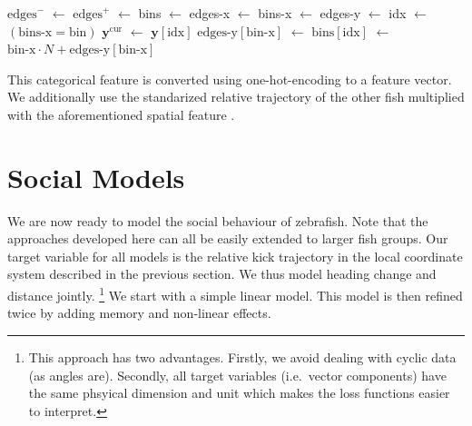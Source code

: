 \documentclass[nobib, a4paper]{tufte-handout}
\newcommand*\Let[2]{\State #1 \(\gets\) #2}
\begin{document}
\MakeRobust{\Call} %
\begin{algorithm}[htb]
  \caption{%
\label{alg:binning}
    Data-driven Spatial Binning}

  \begin{algorithmic}
    \Let{$\text{edges}^-$}{}
    \Let{$\text{edges}^+$}{}
    \State \Return {}
\EndFunction 
{}
\Let{bins}{}
\Let{edges-x}{}
  \Let{bins-x}{}
  \Let{edges-y}{}
  \Let{idx}{$(\text{bins-x} = \text{bin})$}
  \Let{$\bm{y}^{\text{cur}}$}{$\bm{y} [\text{idx}]$}
  \Let{$\text{edges-y}[\text{bin-x}]$}{}
  \Let{$\text{bins}[\text{idx}]$}{$\text{bin-x} \cdot N + \text{edges-y}[\text{bin-x}]$}
\EndFor
{}
\end{algorithmic}
\end{algorithm}

This categorical feature is converted using one-hot-encoding to a feature vector.
We additionally use the standarized relative trajectory of the other fish multiplied with the aforementioned spatial feature%
.

\FloatBarrier{}
\section{Social Models}\label{sec:social}
We are now ready to model the social behaviour of zebrafish.
Note that the approaches developed here can all be easily extended to larger fish groups.
Our target variable for all models is the relative kick trajectory in the local coordinate system described in the previous section.
We thus model heading change and distance jointly.%
\footnote{This approach has two advantages.
  Firstly, we avoid dealing with cyclic data (as angles are).
Secondly, all target variables (i.e.\ vector components) have the same phsyical dimension and unit which makes the loss functions easier to interpret.}
We start with a simple linear model.
This model is then refined twice by adding memory and non-linear effects.
\end{document}
